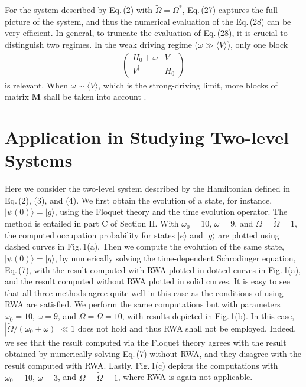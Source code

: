 \documentclass[reprint, amsmath, amssymb, aps]{revtex4-2}
\newcommand{\that}[1]{\widetilde{#1}}
\begin{document}
For the system described by Eq.\,(2) with $\that{\Omega} = \Omega^*$, Eq.\,(27) captures the full picture of the system, and thus the numerical evaluation of the Eq.\,(28) can be very efficient. In general, to truncate the evaluation of Eq.\,(28), it is crucial to distinguish two regimes. In the weak driving regime ($\omega\gg \langle V\rangle$), only one block 
\begin{align*}
\begin{pmatrix}
H_0+\omega & V \\ V^\dagger& H_0
\end{pmatrix}
\end{align*}
is relevant. When $\omega \sim \langle V\rangle$, which is the strong-driving limit, more blocks of matrix $\mathbf{M}$ shall be taken into account \cite{Viebahn}. 

\section{Application in Studying Two-level Systems}
Here we consider the two-level system described by the Hamiltonian defined in Eq.\,(2), (3), and (4). We first obtain the evolution of a state, for instance, $|\psi(0)\rangle =  |g\rangle$, using the Floquet theory and the time evolution operator. The method is entailed in part C of Section II. With $\omega_0 = 10$, $\omega = 9$, and $\Omega =\that{\Omega} = 1$, the computed occupation probability for states $|e\rangle$ and $|g\rangle$ are plotted using dashed curves in Fig.\,1(a). Then we compute the evolution of the same state, $|\psi(0)\rangle =  |g\rangle$, by numerically solving the time-dependent Schrodinger equation, Eq.\,(7), with the result computed with RWA plotted in dotted curves in Fig.\,1(a), and the result computed without RWA plotted in solid curves. It is easy to see that all three methods agree quite well in this case as the conditions of using RWA are satisfied. We perform the same computations but with parameters $\omega_0 = 10$, $\omega = 9$, and $\Omega= \that{\Omega} = 10$, with results depicted in Fig.\,1(b). In this case, $|\that{\Omega}/(\omega_0+\omega)| \ll 1$ does not hold and thus RWA shall not be employed. Indeed, we see that the result computed via the Floquet theory agrees with the result obtained by numerically solving Eq.\,(7) without RWA, and they disagree with the result computed with RWA. Lastly, Fig.\,1(c) depicts the computations with $\omega_0 = 10$, $\omega = 3$, and $\Omega= \that{\Omega} = 1$, where RWA is again not applicable. \\
\end{document}
